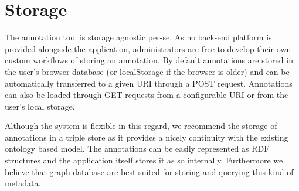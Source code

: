 \section{Storage}

The annotation tool is storage agnostic per-se. As no back-end platform is provided
alongside the application, administrators are free to develop their own custom workflows
of storing an annotation. By default annotations are stored in the user's browser database
(or localStorage if the browser is older) and can be automatically transferred to a given
URI through a POST request. Annotations can also be loaded through GET requests from a
configurable URI or from the user's local storage.

Although the system is flexible in this regard, we recommend the storage of annotations in
a triple store as it provides a nicely continuity with the existing ontology based model.
The annotations can be easily represented as RDF structures and the application itself
stores it as so internally. Furthermore we believe that graph database are best suited for
storing and querying this kind of metadata.


